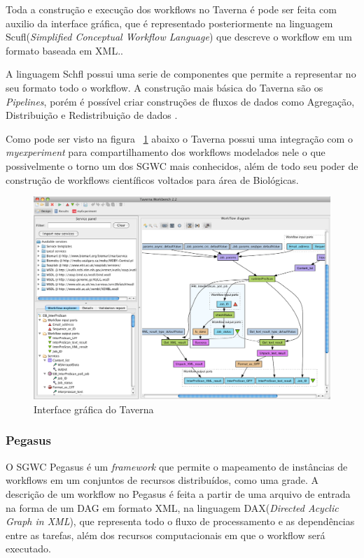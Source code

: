 				Toda a construção e execução dos workflows no Taverna é pode ser feita com auxilio da interface gráfica, que é  representado posteriormente na linguagem Scufl(\textit{Simplified Conceptual Workflow Language}) que descreve o workflow em um formato baseada em XML.\cite{Teixeira2013}. 

				
				A linguagem Schfl possui uma serie de componentes que permite a representar no seu formato todo o workflow. A construção mais básica do Taverna são os \textit{Pipelines}, porém é possível criar construções de fluxos de dados como Agregação, Distribuição e Redistribuição de dados \cite{Teixeira2013}.
		 	
		 		Como pode ser visto na figura ~\ref{taverna} abaixo o Taverna possui uma integração com o \textit{myexperiment} para compartilhamento dos workflows modelados nele o que possivelmente o torno um dos SGWC mais conhecidos, além de todo seu poder de construção de workflows científicos voltados para área de Biológicas.

		 		\begin{figure}[h]
					\centering
					\includegraphics[width=1.1\textwidth]{img/taverna.png}
					\caption{Interface gráfica do Taverna \cite{Taverna}}
					\label{taverna}
				\end{figure}
		
		 				
		\subsubsection{Pegasus}
		
		O SGWC Pegasus é um \textit{framework} que permite o mapeamento de instâncias de workflows em um conjuntos de recursos distribuídos, como uma grade. A descrição de um workflow no Pegasus é feita a partir de uma arquivo de entrada na forma de um DAG em formato XML, na linguagem DAX(\textit{Directed Acyclic Graph in XML}), que representa todo o fluxo de processamento e as dependências entre as tarefas, além dos recursos computacionais em que o workflow será executado\cite{Teixeira2013}.
		
